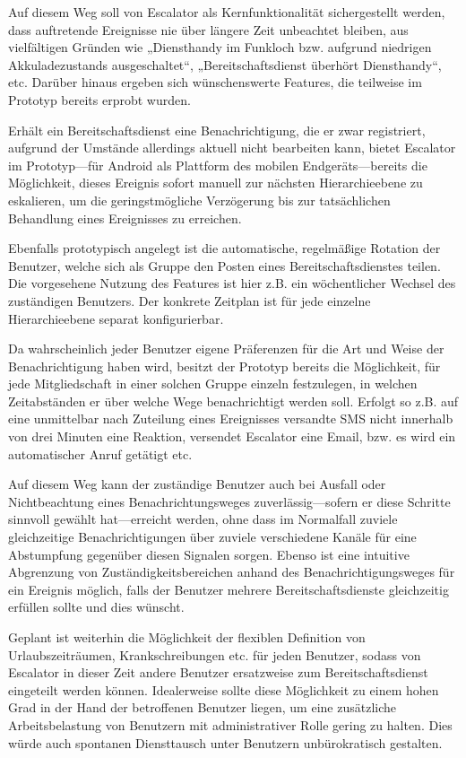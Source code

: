 \documentclass[11pt,utf8,notoc,bibnum,german,final]{zihpub}
\begin{document}
Auf diesem Weg soll von Escalator als Kernfunktionalität sichergestellt werden,
dass auftretende Ereignisse nie über längere Zeit unbeachtet bleiben, aus
vielfältigen Gründen wie „Diensthandy im Funkloch bzw. aufgrund niedrigen
Akkuladezustands ausgeschaltet“, „Bereitschaftsdienst überhört Diensthandy“,
etc. Darüber hinaus ergeben sich wünschenswerte Features, die teilweise im
Prototyp bereits erprobt wurden.

Erhält ein Bereitschaftsdienst eine Benachrichtigung, die er zwar registriert,
aufgrund der Umstände allerdings aktuell nicht bearbeiten kann, bietet
Escalator im Prototyp—für Android als Plattform des mobilen Endgeräts—bereits
die Möglichkeit, dieses Ereignis sofort manuell zur nächsten Hierarchieebene zu
eskalieren, um die geringstmögliche Verzögerung bis zur tatsächlichen
Behandlung eines Ereignisses zu erreichen.

Ebenfalls prototypisch angelegt ist die automatische, regelmäßige Rotation der
Benutzer, welche sich als Gruppe den Posten eines Bereitschaftsdienstes teilen.
Die vorgesehene Nutzung des Features ist hier z.B. ein wöchentlicher Wechsel
des zuständigen Benutzers. Der konkrete Zeitplan ist für jede einzelne
Hierarchieebene separat konfigurierbar.

Da wahrscheinlich jeder Benutzer eigene Präferenzen für die Art und Weise der
Benachrichtigung haben wird, besitzt der Prototyp bereits die Möglichkeit, für
jede Mitgliedschaft in einer solchen Gruppe einzeln festzulegen, in welchen
Zeitabständen er über welche Wege benachrichtigt werden soll. Erfolgt so z.B.
auf eine unmittelbar nach Zuteilung eines Ereignisses versandte SMS nicht
innerhalb von drei Minuten eine Reaktion, versendet Escalator eine Email, bzw.
es wird ein automatischer Anruf getätigt etc.

Auf diesem Weg kann der zuständige Benutzer auch bei Ausfall oder
Nichtbeachtung eines Benachrichtungsweges zuverlässig—sofern er diese Schritte
sinnvoll gewählt hat—erreicht werden, ohne dass im Normalfall zuviele
gleichzeitige Benachrichtigungen über zuviele verschiedene Kanäle für eine
Abstumpfung gegenüber diesen Signalen sorgen. Ebenso ist eine intuitive
Abgrenzung von Zuständigkeitsbereichen anhand des Benachrichtigungsweges für
ein Ereignis möglich, falls der Benutzer mehrere Bereitschaftsdienste
gleichzeitig erfüllen sollte und dies wünscht.


Geplant ist weiterhin die Möglichkeit der flexiblen Definition von
Urlaubszeiträumen, Krankschreibungen etc. für jeden Benutzer, sodass von
Escalator in dieser Zeit andere Benutzer ersatzweise zum Bereitschaftsdienst
eingeteilt werden können. Idealerweise sollte diese Möglichkeit zu einem hohen
Grad in der Hand der betroffenen Benutzer liegen, um eine zusätzliche
Arbeitsbelastung von Benutzern mit administrativer Rolle gering zu halten. Dies
würde auch spontanen Diensttausch unter Benutzern unbürokratisch gestalten.
\end{document}
